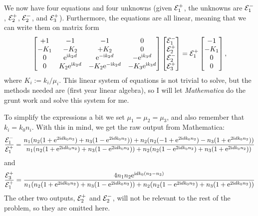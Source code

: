 \documentclass[11pt,letter, swedish, english
]{article}
\begin{document}
We now have four equations and four unknowns (given ${\mathcal{E}_1^+}$, the
unknowns are ${\mathcal{E}_1^-}$, ${\mathcal{E}_2^+}$, ${\mathcal{E}_2^-}$, and ${\mathcal{E}_3^+}$). Furthermore, the
equations are all linear, meaning that we can write them on matrix
form
\begin{equation}\label{eq:1_master}
\begin{bmatrix}
+1 & -1 & -1 & 0 \\
-K_1 & -K_2 & +K_2 &0\\
0& \mathrm{e}^{\mathrm{i} k_2d}& \mathrm{e}^{-\mathrm{i} k_2d}& -\mathrm{e}^{\mathrm{i} k_3d}\\
0& K_2\mathrm{e}^{\mathrm{i} k_2d}& -K_2\mathrm{e}^{-\mathrm{i} k_2d}& -K_3\mathrm{e}^{\mathrm{i} k_3d}\\
\end{bmatrix}
\begin{bmatrix}
{\mathcal{E}_1^-} \\ {\mathcal{E}_2^+} \\ {\mathcal{E}_2^-} \\ {\mathcal{E}_3^+}
\end{bmatrix}
= {\mathcal{E}_1^+}
\begin{bmatrix}
-1 \\ -K_1 \\ 0 \\ 0
\end{bmatrix},
\end{equation}
where $K_i:=k_i/\mu_i$. This linear system of equations is not trivial
to solve, but the methods needed are (first year linear algebra), so I
will let \textit{Mathematica} do the grunt work and solve this system
for me. 

To simplify the expressions a bit we set $\mu_1=\mu_2=\mu_3$, and also
remember that $k_i=k_0n_i$. With this in mind, we get the raw output
from Mathematica:
\begin{equation}\label{eq:1_Em}
\frac{{\mathcal{E}_1^-}}{{\mathcal{E}_1^+}}=
\frac{
n_1 (n_2(1 + \mathrm{e}^{2\mathrm{i} dk_0n_2}) + n_3(1 - \mathrm{e}^{2\mathrm{i} dk_0n_2})) + 
 n_2 (n_2(-1 + \mathrm{e}^{2\mathrm{i} dk_0n_2}) - n_3(1 + \mathrm{e}^{2\mathrm{i} dk_0n_2}))
}{
n_1 (n_2(1 + \mathrm{e}^{2\mathrm{i} dk_0n_2}) + n_3(1 - \mathrm{e}^{2\mathrm{i} dk_0n_2})) + 
 n_2 (n_2(1 - \mathrm{e}^{2\mathrm{i} dk_0n_2}) + n_3(1 + \mathrm{e}^{2\mathrm{i} dk_0n_2}))
}
\end{equation}
and 
\begin{equation}\label{eq:1_Eppp}
\frac{{\mathcal{E}_3^+}}{{\mathcal{E}_1^+}} = 
\frac{
4n_1n_2 \mathrm{e}^{\mathrm{i} d k_0(n_2-n_3)}
}{
n_1 (n_2(1 + \mathrm{e}^{2\mathrm{i} dk_0n_2}) + n_3(1 - \mathrm{e}^{2\mathrm{i} dk_0n_2})) + 
 n_2 (n_2(1 - \mathrm{e}^{2\mathrm{i} dk_0n_2}) + n_3(1 + \mathrm{e}^{2\mathrm{i} dk_0n_2}))
}
\end{equation}
The other two outputs, ${\mathcal{E}_2^+}$ and ${\mathcal{E}_2^-}$, will not be relevant to the
rest of the problem, so they are omitted here. 
\end{document}
